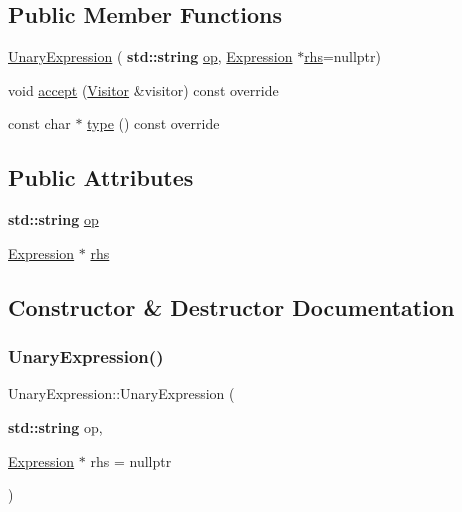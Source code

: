 \subsection*{Public Member Functions}
\begin{DoxyCompactItemize}
\item 
\hyperlink{struct_unary_expression_a0a2158571198f271b43612707666e8fa}{Unary\+Expression} (\textbf{ std\+::string} \hyperlink{struct_unary_expression_a057cfd54844d5b36e15f16ee5272b071}{op}, \hyperlink{struct_expression}{Expression} $\ast$\hyperlink{struct_unary_expression_a53e53c6c0a0b76c46cb49a1fa48be5a5}{rhs}=nullptr)
\item 
void \hyperlink{struct_unary_expression_a88c89a0268ecfa5008b5afe7bc47913a}{accept} (\hyperlink{struct_visitor}{Visitor} \&visitor) const override
\item 
const char $\ast$ \hyperlink{struct_unary_expression_ae98f7830a67f58e467de4bae7af035ab}{type} () const override
\end{DoxyCompactItemize}
\subsection*{Public Attributes}
\begin{DoxyCompactItemize}
\item 
\textbf{ std\+::string} \hyperlink{struct_unary_expression_a057cfd54844d5b36e15f16ee5272b071}{op}
\item 
\hyperlink{struct_expression}{Expression} $\ast$ \hyperlink{struct_unary_expression_a53e53c6c0a0b76c46cb49a1fa48be5a5}{rhs}
\end{DoxyCompactItemize}


\subsection{Constructor \& Destructor Documentation}
\mbox{\label{struct_unary_expression_a0a2158571198f271b43612707666e8fa}} 
\subsubsection{\texorpdfstring{Unary\+Expression()}{UnaryExpression()}}
{\footnotesize\ttfamily Unary\+Expression\+::\+Unary\+Expression (\begin{DoxyParamCaption}\item[{\textbf{ std\+::string}}]{op,  }\item[{\hyperlink{struct_expression}{Expression} $\ast$}]{rhs = {\ttfamily nullptr} }\end{DoxyParamCaption})\hspace{0.3cm}{\ttfamily [inline]}}




